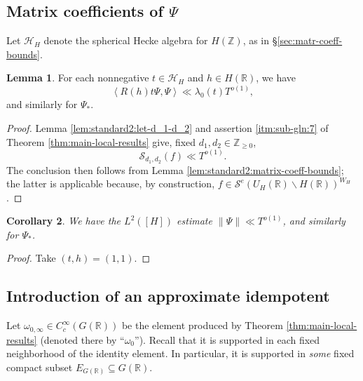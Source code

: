 \documentclass[reqno]{amsart}
\theoremstyle{plain} \newtheorem{theorem} {Theorem}
\newtheorem{corollary} [theorem] {Corollary}
\theoremstyle{definition} \newtheorem{definition} [theorem] {Definition}
\theoremstyle{itplain} %
\newtheorem{lemma}[theorem]{Lemma}
\numberwithin{equation}{section}
\numberwithin{theorem}{section}
\renewcommand{\geq}{\geqslant}
\begin{document}

\subsection{Matrix coefficients of $\Psi$}\label{sec:matr-coeff-our}
Let $\mathcal{H}_H$ denote the spherical Hecke algebra for $H(\mathbb{Z})$, as in \S\ref{sec:matr-coeff-bounds}.
\begin{lemma}\label{lem:sub-gln:each-y-in}
  For each nonnegative $t \in \mathcal{H}_H$ and $h \in H(\mathbb{R})$, we have
  \begin{equation}
    \left\langle R(h) t \Psi, \Psi  \right\rangle \ll \lambda_0(t) T^{o(1)},
  \end{equation}
  and similarly for $\Psi_{\ast}$.
\end{lemma}
\begin{proof}
  Lemma \ref{lem:standard2:let-d_1-d_2} and assertion \eqref{itm:sub-gln:7} of Theorem \ref{thm:main-local-results} give, fixed $d_1, d_2 \in \mathbb{Z}_{\geq 0}$,
  \begin{equation*}
    \mathcal{S}_{d_1,d_2}(f) \ll T^{o(1)}.
  \end{equation*}
  The conclusion then follows from Lemma \ref{lem:standard2:matrix-coeff-bounds}; the latter is applicable because, by construction, $f \in \mathcal{S}^e(U_H(\mathbb{R}) \backslash H(\mathbb{R}))^{W_H}$.
\end{proof}

\begin{corollary}\label{cor:standard2:we-have-psi}
  We have the $L^2([H])$ estimate $\|\Psi \| \ll T^{o(1)}$, and similarly for $\Psi_{\ast}$.
\end{corollary}
\begin{proof}
  Take $(t,h) = (1,1)$.
\end{proof}


\subsection{Introduction of an approximate idempotent}\label{sec:intr-an-appr}
Let $\omega_{0,\infty} \in C_c^\infty(G(\mathbb{R}))$ be the element produced by Theorem \ref{thm:main-local-results} (denoted there by ``$\omega_0$'').  Recall that it is supported in each fixed neighborhood of the identity element.  In particular, it is supported in \emph{some} fixed compact subset  $E_{G(\mathbb{R})} \subseteq G(\mathbb{R})$.
\end{document}
